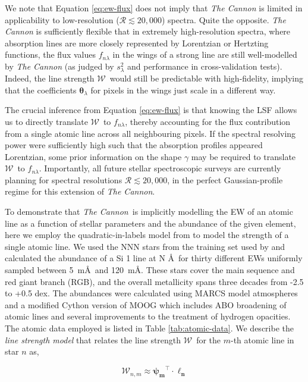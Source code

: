 \documentclass[useAMS,usenatbib]{mn2e}
\newcommand\tc{\textit{The Cannon}}
\newcommand\lv{\mathbf{\boldsymbol\ell_n}}
\newcommand\cv{{\boldsymbol\theta}_\lambda}
\newcommand\ssq{s_\lambda^2}
\newcommand\ew{$\mathcal{W}$}
\newcommand\psiv{\mathbf{\boldsymbol{\psi}_m}}
\begin{document}
We note that Equation \ref{eq:ew-flux} does not imply that \tc{} is limited in
applicability to low-resolution ($\mathcal{R} \lesssim 20,000$) spectra. Quite 
the opposite. \tc{} is sufficiently flexible that in extremely high-resolution 
spectra, where absorption lines are more closely represented by Lorentzian or
Hertzting functions, the flux values $f_{n\lambda}$ in the wings of a strong 
line are still well-modelled by \tc{} (as judged by $\ssq$ and performance in
cross-validation tests). Indeed, the line strength \ew\ would still be 
predictable with high-fidelity, implying that the coefficients $\cv$ for pixels
in the wings just scale in a different way. 

The crucial inference from Equation \ref{eq:ew-flux} is that knowing the LSF
allows us to directly translate \ew\ to $f_{n\lambda}$, thereby accounting for 
the flux contribution from a single atomic line across all neighbouring pixels.
If the spectral resolving power were sufficiently high such that the absorption
profiles appeared Lorentzian, some prior information on the shape $\gamma$
may be required to translate \ew\ to $f_{n\lambda}$. Importantly, all future 
stellar spectroscopic surveys are currently planning for spectral resolutions
$\mathcal{R} \lesssim 20,000$, in the perfect Gaussian-profile regime for this
extension of \tc{}.


To demonstrate that \tc\ is implicitly modelling the EW of an atomic line as
a function of stellar parameters and the abundance of the given element,
here we employ the quadratic-in-labels model from \citet{Ness2015a} to
model the strength of a single atomic line. We used the NNN stars from the
training set used by \citet{Ness2015a} and calculated the abundance of a
Si 1 line at N \AA\ for thirty different EWs uniformly sampled between 5~m\AA\
and 120~m\AA. These stars cover the main sequence and red giant branch
(RGB), and the overall metallicity spans three decades from -2.5 to +0.5 dex.
The abundances were calculated using MARCS model atmospheres \citep{marcs}
and a modified Cython version of MOOG \citep[][2014 version]{Sneden1973}
which includes ABO broadening of atomic lines \citep{ABO} and several 
improvements to the treatment of hydrogen opacities. The atomic data
employed is listed in Table \ref{tab:atomic-data}. We describe the 
\textit{line strength model} that relates the line strength \ew\ for the $m$-th
atomic line in star $n$ as,

\begin{equation}
\mathcal{W}_{n,m} \approx \psiv^{\intercal}\cdot\lv
\label{eq:line-strength-model}
\end{equation}
\end{document}
